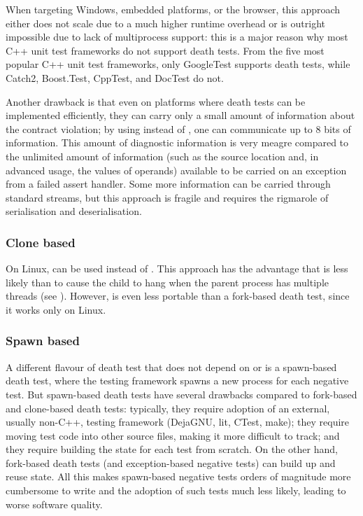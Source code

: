 When targeting Windows, embedded platforms, or the browser, this approach either does not scale due to a much higher runtime overhead or is outright impossible due to lack of multiprocess support: this is a major reason why most C++ unit test frameworks do not support death tests. From the five most popular C++ unit test frameworks, only GoogleTest supports death tests, while Catch2, Boost.Test, CppTest, and DocTest do not.

Another drawback is that even on platforms where death tests can be implemented efficiently, they can carry only a small amount of information about the contract violation; by using  instead of , one can communicate up to 8 bits of information. This amount of diagnostic information is very meagre compared to the unlimited amount of information (such as the source location and, in advanced usage, the values of operands) available to be carried on an exception from a failed assert handler. Some more information can be carried through standard streams, but this approach is fragile and requires the rigmarole of serialisation and deserialisation.

\subsubsection{Clone based}

On Linux,  can be used instead of . This approach has the advantage that  is less likely than  to cause the child to hang when the parent process has multiple threads (see \cite{GTestDocDeathTests}). However,  is even less portable than a fork-based death test, since it works only on Linux.

\subsubsection{Spawn based}

A different flavour of death test that does not depend on  or  is a spawn-based death test, where the testing framework spawns a new process for each negative test. But spawn-based death tests have several drawbacks compared to fork-based and clone-based death tests: typically, they require adoption of an external, usually non-C++, testing framework (DejaGNU, lit, CTest, make); they require moving test code into other source files, making it more difficult to track; and they require building the state for each test from scratch. On the other hand, fork-based death tests (and exception-based negative tests) can build up and reuse state. All this makes spawn-based negative tests orders of magnitude more cumbersome to write and the adoption of such tests much less likely, leading to worse software quality.

